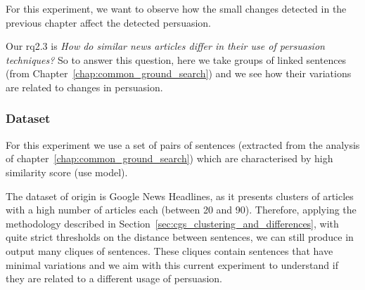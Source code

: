For this experiment, we want to observe how the small changes detected in the previous chapter affect the detected persuasion.

Our \acrshort{rq}2.3 is \emph{How do similar news articles differ in their use of persuasion techniques?}
So to answer this question, here we take groups of linked sentences (from Chapter~\ref{chap:common_ground_search}) and we see how their variations are related to changes in persuasion.

\subsubsection{Dataset}
\label{ssec:lp_relationship_small_variations_data}

For this experiment we use a set of pairs of sentences (extracted from the analysis of chapter~\ref{chap:common_ground_search}) which are characterised by high similarity score (\acrshort{use} model).

The dataset of origin is Google News Headlines, as it presents clusters of articles with a high number of articles each (between 20 and 90). Therefore, applying the methodology described in Section~\ref{sec:cgs_clustering_and_differences}, with quite strict thresholds on the distance between sentences, we can still produce in output many cliques of sentences. These cliques contain sentences that have minimal variations and we aim with this current experiment to understand if they are related to a different usage of persuasion.

